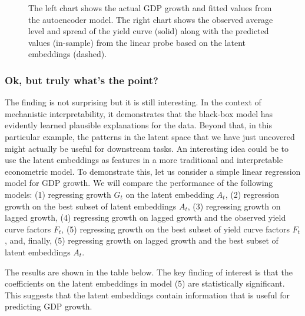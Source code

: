 \documentclass{article}
\theoremstyle{plain}
\theoremstyle{definition}
\theoremstyle{remark}
\begin{document}
\begin{figure}


\caption{\label{fig-dl-results}The left chart shows the actual GDP growth
and fitted values from the autoencoder model. The right chart shows the
observed average level and spread of the yield curve (solid) along with
the predicted values (in-sample) from the linear probe based on the latent embeddings
(dashed).}

\end{figure}%

\subsubsection{Ok, but truly what's the
point?}\label{ok-but-truly-whats-the-point}

The finding is not surprising but it is still interesting. In the
context of mechanistic interpretability, it demonstrates that the
black-box model has evidently learned plausible explanations for the
data. Beyond that, in this particular example, the patterns in the
latent space that we have just uncovered might actually be useful for
downstream tasks. An interesting idea could be to use the latent
embeddings as features in a more traditional and interpretable
econometric model. To demonstrate this, let us consider a simple linear
regression model for GDP growth. We will compare the performance of the
following models: (1) regressing growth \(G_t\) on the latent embedding
\(A_t\), (2) regression growth on the best subset of latent embeddings
\(A_t\), (3) regressing growth on lagged growth, (4) regressing growth
on lagged growth and the observed yield curve factors \(F_t\), (5)
regressing growth on the best subset of yield curve factors \(F_t\),
and, finally, (5) regressing growth on lagged growth and the best subset
of latent embeddings \(A_t\).

The results are shown in the table below. The key finding of interest is
that the coefficients on the latent embeddings in model (5) are
statistically significant. This suggests that the latent embeddings
contain information that is useful for predicting GDP growth.
\end{document}
